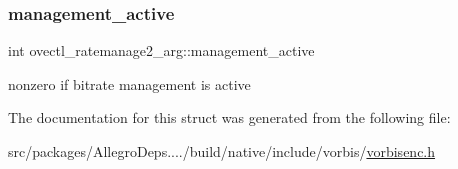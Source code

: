 \subsubsection{\texorpdfstring{management\+\_\+active}{management\_active}}
{\footnotesize\ttfamily int ovectl\+\_\+ratemanage2\+\_\+arg\+::management\+\_\+active}

nonzero if bitrate management is active 

The documentation for this struct was generated from the following file\+:\begin{DoxyCompactItemize}
\item 
src/packages/\+Allegro\+Deps..../build/native/include/vorbis/\hyperlink{vorbisenc_8h}{vorbisenc.\+h}\end{DoxyCompactItemize}
